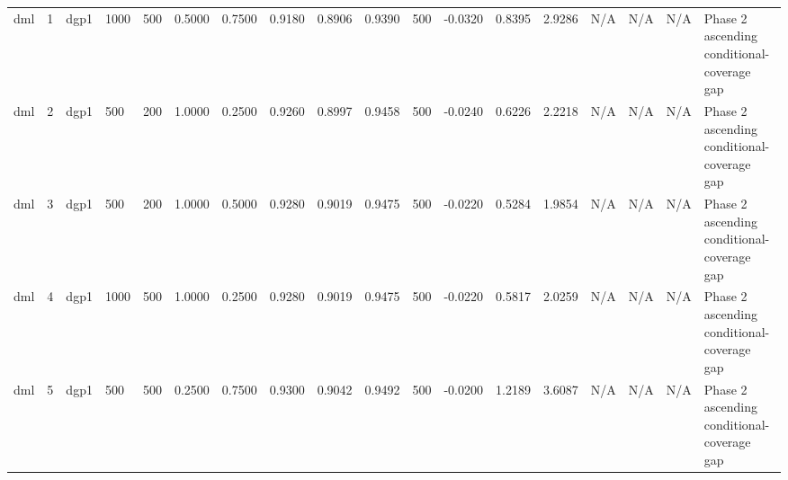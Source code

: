 {\begin{tabular}{llllllllllllllllll}
dml & 1 & dgp1 & 1000 & 500 & 0.5000 & 0.7500 & 0.9180 & 0.8906 & 0.9390 & 500 & -0.0320 & 0.8395 & 2.9286 & N/A & N/A & N/A & Phase 2 ascending conditional-coverage gap \\
dml & 2 & dgp1 & 500 & 200 & 1.0000 & 0.2500 & 0.9260 & 0.8997 & 0.9458 & 500 & -0.0240 & 0.6226 & 2.2218 & N/A & N/A & N/A & Phase 2 ascending conditional-coverage gap \\
dml & 3 & dgp1 & 500 & 200 & 1.0000 & 0.5000 & 0.9280 & 0.9019 & 0.9475 & 500 & -0.0220 & 0.5284 & 1.9854 & N/A & N/A & N/A & Phase 2 ascending conditional-coverage gap \\
dml & 4 & dgp1 & 1000 & 500 & 1.0000 & 0.2500 & 0.9280 & 0.9019 & 0.9475 & 500 & -0.0220 & 0.5817 & 2.0259 & N/A & N/A & N/A & Phase 2 ascending conditional-coverage gap \\
dml & 5 & dgp1 & 500 & 500 & 0.2500 & 0.7500 & 0.9300 & 0.9042 & 0.9492 & 500 & -0.0200 & 1.2189 & 3.6087 & N/A & N/A & N/A & Phase 2 ascending conditional-coverage gap \\
\hline
\end{tabular}
}
